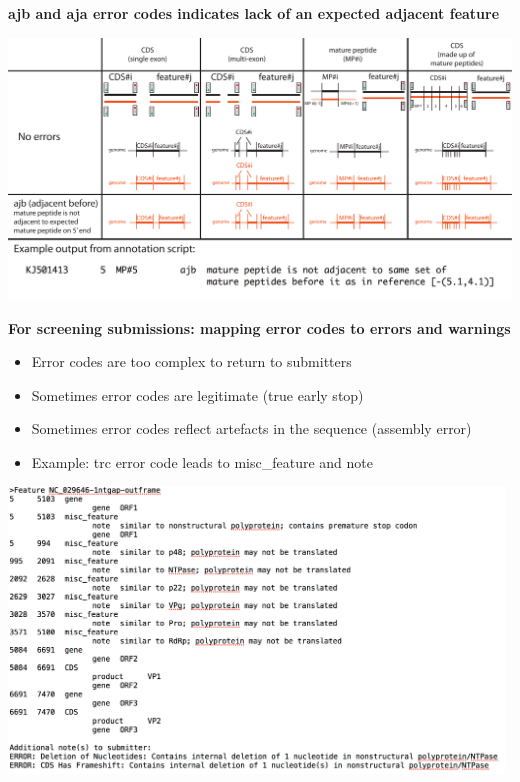\documentclass[landscape]{slides}
\begin{document}
\begin{slide}
\begin{center}
\textbf{ajb and aja error codes indicates lack of an expected adjacent feature}
\vspace{0.5in}

\includegraphics[width=10in]{figs/errornew-4-ajb}
\end{center}
\vfill
\end{slide}
\begin{slide}
\begin{center}
\textbf{For screening submissions: mapping error codes to errors and warnings}

\small
\begin{itemize}
\item Error codes are too complex to return to submitters
\item Sometimes error codes are legitimate (true early stop)
\item Sometimes error codes reflect artefacts in the sequence (assembly error)
\item Example: trc error code leads to misc_feature and note
\end{itemize}

\includegraphics[height=3in]{figs/noro-ftable-example}

\end{center}
\vfill
\end{slide}
\end{document}
